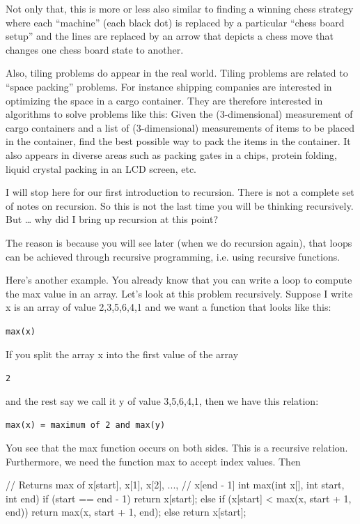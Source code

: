 Not only that, this is more or less also similar to finding a winning
chess strategy where each ``machine'' (each black dot) is replaced by a
particular ``chess board setup'' and the lines are replaced by an arrow
that depicts a chess move that changes one chess board state to another.

Also, tiling problems do appear in the real world. Tiling problems are
related to ``space packing'' problems. For instance shipping companies
are interested in optimizing the space in a cargo container. They are
therefore interested in algorithms to solve problems like this: Given
the (3-dimensional) measurement of cargo containers and a list of
(3-dimensional) measurements of items to be placed in the container,
find the best possible way to pack the items in the container. It also
appears in diverse areas such as packing gates in a chips, protein
folding, liquid crystal packing in an LCD screen, etc.

I will stop here for our first introduction to recursion. There is not a
complete set of notes on recursion. So this is not the last time you
will be thinking recursively. But \ldots{} why did I bring up recursion
at this point?

The reason is because you will see later (when we do recursion again),
that loops can be achieved through recursive programming, i.e. using
recursive functions.



\newpage{}

Here's another example. You already know that you can
write a loop to compute the max value in an array. Let's
look at this problem recursively. Suppose I write x is an array of
value 2,3,5,6,4,1 and we want a function that looks like this:

\verb!max(x)!

If you split the array x into the first value of the array

\verb!2!

and the rest say we call it y of value 3,5,6,4,1, then we have this
relation:

\verb!max(x) = maximum of 2 and max(y)!

You see that the max function occurs on both sides. This is a recursive
relation. Furthermore, we need the function max to accept index values.
Then

\begin{consolethree}[escapeinside=||]
// Returns max of x[start], x[1], x[2], ...,
// x[end - 1]
int max(int x[], int start, int end)
{
    if (start == end - 1)
    {
        return x[start];
    }
    else
    {
        if (x[start] < max(x, start + 1, end))
        {
            return max(x, start + 1, end);
        }
        else
        {
            return x[start];
        }
    }
}
\end{consolethree}

